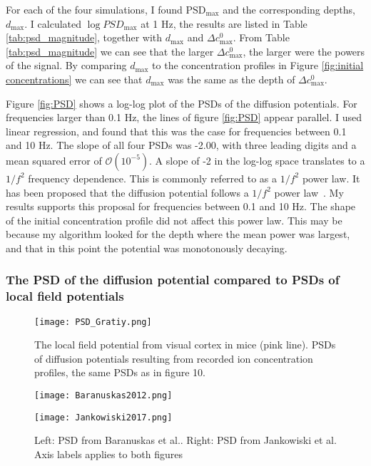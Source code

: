 \documentclass{article}
\begin{document}
For each of the four simulations, I found $\text{PSD}_{\text{max}}$ and the corresponding depths, $d_{\text{max}}$. I calculated $\log PSD_{\text{max}}$ at 1 Hz, the results are listed in Table \ref{tab:psd_magnitude}, together with $d_{\text{max}}$ and $\Delta c^0_{\text{max}}$. From Table  \ref{tab:psd_magnitude} we can see that the larger  $\Delta c^0_{\text{max}}$, the larger were the powers of the signal. By comparing $d_{\text{max}}$ to the concentration profiles in Figure \ref{fig:initial concentrations} we can see that $d_{\text{max}}$ was the same as the depth of $\Delta c^0_{\text{max}}$.




Figure \ref{fig:PSD} shows a log-log plot of the PSDs of the diffusion potentials.  For frequencies larger than 0.1 Hz, the lines of figure \ref{fig:PSD} appear parallel. I used linear regression, and found that this was the case for frequencies between 0.1 and 10 Hz. The slope of all four PSDs was -2.00, with three leading digits and a mean squared error of $\mathcal{O}(10^{-5})$. A slope of -2 in the log-log space translates to a $1/f^2$ frequency dependence. This is commonly referred to as a $1/f^2$ power law. It has been proposed that the diffusion potential follows a $1/f^2$ power law~\cite{Halnes2016}. My results supports this proposal for frequencies between 0.1 and 10 Hz. The shape of the initial concentration profile did not affect this power law. This may be because my algorithm looked for the depth where the mean power was largest, and that in this point the potential was monotonously decaying. 


\subsubsection{The PSD of the diffusion potential compared to PSDs of local field potentials}

\begin{figure}
  \texttt{[image: PSD\_Gratiy.png]}
  \caption{The local field potential from visual cortex in mice (pink line). PSDs of diffusion potentials resulting from recorded ion concentration profiles, the same PSDs as in figure 10.}
  \label{fig:PSD_Gratiy}
\end{figure}


\begin{figure}
 \centering
   \begin{minipage}[b]{0.45\textwidth}
    \texttt{[image: Baranuskas2012.png]}
  \end{minipage}
     \begin{minipage}[b]{0.5\textwidth}
    \texttt{[image: Jankowiski2017.png]}
  \end{minipage}
  \caption{Left: PSD from Baranuskas et al.. Right: PSD from Jankowiski et al. Axis labels applies to both figures}
  \label{fig:PSD_of_LFP}
\end{figure}
\end{document}
